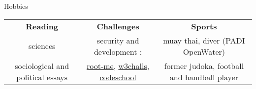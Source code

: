\begin{rSection}{Hobbies}

  \begin{center}
      \begin{tabular}
          {c | c | c}
          \textbf{Reading} & \textbf{Challenges} & \textbf{Sports} \\
          sciences & security and development : &  muay thai, diver (PADI OpenWater) \\
          sociological and political essays  & \href{http://www.root-me.org/Pamplemouss_?inc=score&lang=en}{root-me}, \href{https://w3challs.com/profile/Pamplemouss_}{w3challs}, \href{https://www.codeschool.com/users/Pamplemouss_}{codeschool} & former judoka, football and handball player \\
      \end{tabular}
  \end{center}

\end{rSection}
